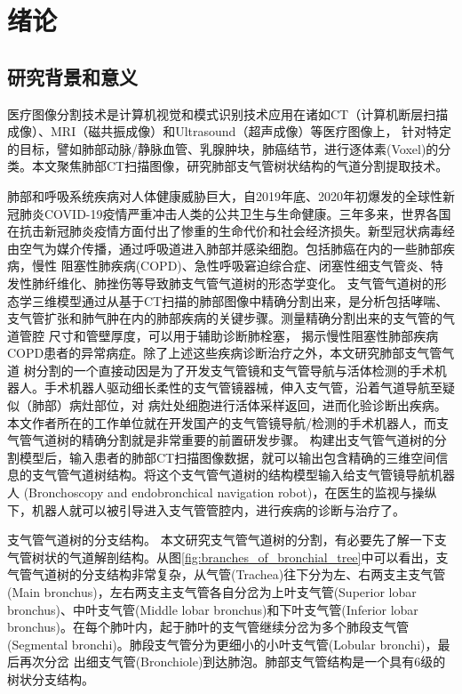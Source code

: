 
\chapter{绪论}\label{chap:introduction}

\section{研究背景和意义}

医疗图像分割技术是计算机视觉和模式识别技术应用在诸如CT（计算机断层扫描成像）、MRI（磁共振成像）和Ultrasound（超声成像）等医疗图像上，
针对特定的目标，譬如肺部动脉/静脉血管、乳腺肿块，肺癌结节，进行逐体素(Voxel)的分类。本文聚焦肺部CT扫描图像，研究肺部支气管树状结构的气道分割提取技术。


肺部和呼吸系统疾病对人体健康威胁巨大，自2019年底、2020年初爆发的全球性新冠肺炎COVID-19疫情严重冲击人类的公共卫生与生命健康。三年多来，世界各国在抗击新冠肺炎疫情方面付出了惨重的生命代价和社会经济损失。新型冠状病毒经由空气为媒介传播，通过呼吸道进入肺部并感染细胞。包括肺癌在内的一些肺部疾病，慢性
阻塞性肺疾病(COPD)\cite{fetita2004pulmonary}、急性呼吸窘迫综合症\cite{howling1998significance}、闭塞性细支气管炎\cite{shaw2002role}、特发性肺纤维化\cite{wu2019computed}、肺挫伤\cite{li2019application}等导致肺支气管气道树的形态学变化。
支气管气道树的形态学三维模型通过从基于CT扫描的肺部图像中精确分割出来，是分析包括哮喘、支气管扩张和肺气肿在内的肺部疾病的关键步骤。测量精确分割出来的支气管的气道管腔
尺寸和管壁厚度，可以用于辅助诊断肺栓塞\cite{estepar2013computed}， 揭示慢性阻塞性肺部疾病COPD患者的异常病症。除了上述这些疾病诊断治疗之外，本文研究肺部支气管气道
树分割的一个直接动因是为了开发支气管镜和支气管导航与活体检测的手术机器人。手术机器人驱动细长柔性的支气管镜器械，伸入支气管，沿着气道导航至疑似（肺部）病灶部位，对
病灶处细胞进行活体采样返回，进而化验诊断出疾病。本文作者所在的工作单位就在开发国产的支气管镜导航/检测的手术机器人，而支气管气道树的精确分割就是非常重要的前置研发步骤。
构建出支气管气道树的分割模型后，输入患者的肺部CT扫描图像数据，就可以输出包含精确的三维空间信息的支气管气道树结构。将这个支气管气道树的结构模型输入给支气管镜导航机器人
(Bronchoscopy and endobronchical navigation robot)，在医生的监视与操纵下，机器人就可以被引导进入支气管管腔内，进行疾病的诊断与治疗了。

{\heiti 支气管气道树的分支结构。} 本文研究支气管气道树的分割，有必要先了解一下支气管树状的气道解剖结构。从图\ref{fig:branches_of_bronchial_tree}中可以看出，支气管气道树的分支结构非常复杂，从气管(Trachea)往下分为左、右两支主支气管(Main bronchus)，左右两支主支气管各自分岔为上叶支气管(Superior lobar bronchus)、中叶支气管(Middle lobar bronchus)和下叶支气管(Inferior
 lobar bronchus)。在每个肺叶内，起于肺叶的支气管继续分岔为多个肺段支气管(Segmental bronchi)。肺段支气管分为更细小的小叶支气管(Lobular bronchi)，最后再次分岔
 出细支气管(Bronchiole)到达肺泡。肺部支气管结构是一个具有6级的树状分支结构。

